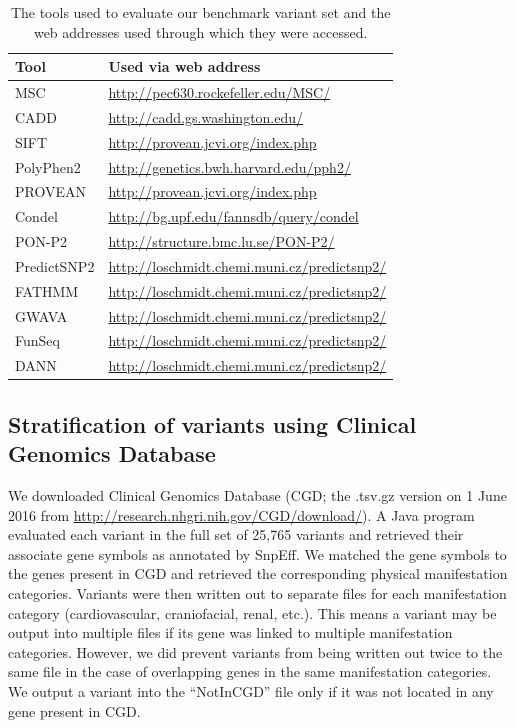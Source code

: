 \begin{table}
\begin{tabulary}{\linewidth}{LL}
  Tool & Used via web address \\
  \hline
  \rule{0pt}{2.5ex}MSC & \url{http://pec630.rockefeller.edu/MSC/} \\
  \rule{0pt}{2.5ex}CADD & \url{http://cadd.gs.washington.edu/} \\
  \rule{0pt}{2.5ex}SIFT & \url{http://provean.jcvi.org/index.php} \\
  \rule{0pt}{2.5ex}PolyPhen2 & \url{http://genetics.bwh.harvard.edu/pph2/} \\
  \rule{0pt}{2.5ex}PROVEAN & \url{http://provean.jcvi.org/index.php} \\
  \rule{0pt}{2.5ex}Condel & \url{http://bg.upf.edu/fannsdb/query/condel} \\
  \rule{0pt}{2.5ex}PON-P2 & \url{http://structure.bmc.lu.se/PON-P2/} \\
  \rule{0pt}{2.5ex}PredictSNP2 & {\footnotesize\url{http://loschmidt.chemi.muni.cz/predictsnp2/}} \\
  \rule{0pt}{2.5ex}FATHMM & {\footnotesize\url{http://loschmidt.chemi.muni.cz/predictsnp2/}} \\
  \rule{0pt}{2.5ex}GWAVA & {\footnotesize\url{http://loschmidt.chemi.muni.cz/predictsnp2/}} \\
  \rule{0pt}{2.5ex}FunSeq & {\footnotesize\url{http://loschmidt.chemi.muni.cz/predictsnp2/}} \\
  \rule{0pt}{2.5ex}DANN & {\footnotesize\url{http://loschmidt.chemi.muni.cz/predictsnp2/}} \\
  \hline
\end{tabulary}
\caption[Tools used to evaluate our benchmark variant set]{The tools used to evaluate our benchmark variant set and the web addresses used through which they were accessed.}
\label{table:tool_urls}
\end{table}


\subsection[Stratification of variants using ClinGenDatab.]{Stratification of variants using Clinical Genomics Database}
We downloaded Clinical Genomics Database (CGD; the .tsv.gz version on 1 June 2016 from \url{http://research.nhgri.nih.gov/CGD/download/}).
A Java program evaluated each variant in the full set of 25,765 variants and retrieved their associate gene symbols as annotated by SnpEff.
We matched the gene symbols to the genes present in CGD and retrieved the corresponding physical manifestation categories.
Variants were then written out to separate files for each manifestation category (cardiovascular, craniofacial, renal, etc.).
This means a variant may be output into multiple files if its gene was linked to multiple manifestation categories.
However, we did prevent variants from being written out twice to the same file in the case of overlapping genes in the same manifestation categories.
We output a variant into the “NotInCGD” file only if it was not located in any gene present in CGD.

